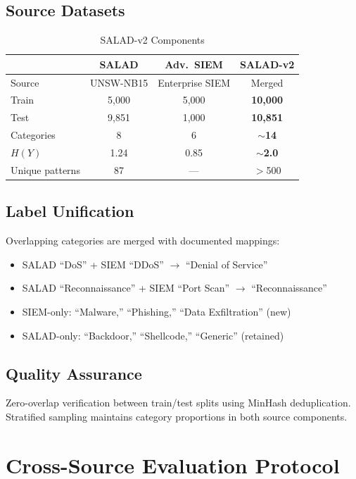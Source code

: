 \documentclass[journal]{IEEEtran}
\begin{document}
\subsection{Source Datasets}

\begin{table}[!ht]
\centering\caption{SALAD-v2 Components}
\begin{tabular}{lccc}
\toprule & \textbf{SALAD} & \textbf{Adv.\ SIEM} & \textbf{SALAD-v2} \\
\midrule
Source & UNSW-NB15 & Enterprise SIEM & Merged \\
Train & 5,000 & 5,000 & \textbf{10,000} \\
Test & 9,851 & 1,000 & \textbf{10,851} \\
Categories & 8 & 6 & \textbf{$\sim$14} \\
$H(Y)$ & 1.24 & 0.85 & \textbf{$\sim$2.0} \\
Unique patterns & 87 & --- & $>$500 \\
\bottomrule
\end{tabular}
\end{table}

\subsection{Label Unification}
Overlapping categories are merged with documented mappings:
\begin{itemize}
\item SALAD ``DoS'' + SIEM ``DDoS'' $\to$ ``Denial of Service''
\item SALAD ``Reconnaissance'' + SIEM ``Port Scan'' $\to$ ``Reconnaissance''
\item SIEM-only: ``Malware,'' ``Phishing,'' ``Data Exfiltration'' (new)
\item SALAD-only: ``Backdoor,'' ``Shellcode,'' ``Generic'' (retained)
\end{itemize}

\subsection{Quality Assurance}
Zero-overlap verification between train/test splits using MinHash deduplication. Stratified sampling maintains category proportions in both source components.

\section{Cross-Source Evaluation Protocol}
\end{document}
